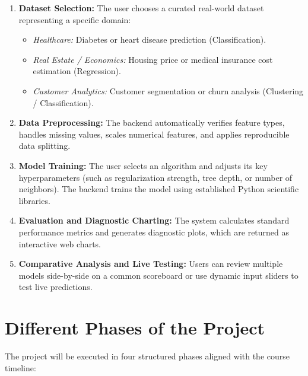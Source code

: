 \documentclass[11pt,a4paper]{article}
\begin{document}
\begin{enumerate}[leftmargin=*,itemsep=2pt,topsep=2pt]
    \item \textbf{Dataset Selection:} The user chooses a curated real-world dataset representing a specific domain:
    \begin{itemize}[leftmargin=*,itemsep=0pt,topsep=1pt]
        \item \textit{Healthcare:} Diabetes or heart disease prediction (Classification).
        \item \textit{Real Estate / Economics:} Housing price or medical insurance cost estimation (Regression).
        \item \textit{Customer Analytics:} Customer segmentation or churn analysis (Clustering / Classification).
    \end{itemize}
    \item \textbf{Data Preprocessing:} The backend automatically verifies feature types, handles missing values, scales numerical features, and applies reproducible data splitting.
    \item \textbf{Model Training:} The user selects an algorithm and adjusts its key hyperparameters (such as regularization strength, tree depth, or number of neighbors). The backend trains the model using established Python scientific libraries.
    \item \textbf{Evaluation and Diagnostic Charting:} The system calculates standard performance metrics and generates diagnostic plots, which are returned as interactive web charts.
    \item \textbf{Comparative Analysis and Live Testing:} Users can review multiple models side-by-side on a common scoreboard or use dynamic input sliders to test live predictions.
\end{enumerate}

\section{Different Phases of the Project}
\label{sec:phases}
The project will be executed in four structured phases aligned with the course timeline:
\end{document}
